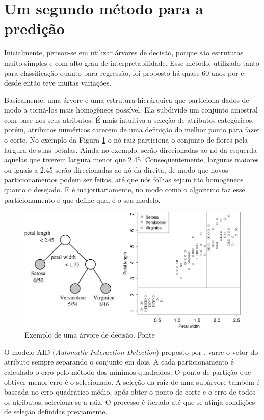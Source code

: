 \documentclass{article}
\begin{document}
\section{Um segundo método para a predição} \label{sec:firstpage}

Inicialmente, pensou-se em utilizar árvores de decisão, porque são estruturas muito simples e com alto grau de interpretabilidade. Esse método, utilizado tanto para classificação quanto para regressão, foi proposto há quase 60 anos por \cite{Morgan_1963} e desde então teve muitas variações.

Basicamente, uma árvore é uma estrutura hierárquica que particiona dados de modo a torná-los mais homogêneos possível. Ela subdivide um conjunto amostral com base nos seus atributos. É mais intuitiva a seleção de atributos categóricos, porém, atributos numéricos carecem de uma definição do melhor ponto para fazer o corte. No exemplo da Figura \ref{Fig1} o nó raiz particiona o conjunto de flores pela largura de suas pétalas. Ainda no exemplo, serão direcionadas ao nó da esquerda aquelas que tiverem largura menor que 2.45. Consequentemente, larguras maiores ou iguais a 2.45 serão direcionadas ao nó da direita, de modo que novos particionamentos podem ser feitos, até que nós folhas sejam tão homogêneos quanto o desejado. E é majoritariamente, no modo como o algoritmo faz esse particionamento é que define qual é o seu modelo.

\begin{figure}[ht]
\centering
\includegraphics[width=.5\textwidth]{fig1.png}
\caption{Exemplo de uma árvore de decisão. Fonte \cite{Loh_2014}}
\label{Fig1}
\end{figure}

O modelo AID (\emph{Automatic Interaction Detection}) proposto por \cite{Morgan_1963}, varre o vetor do atributo sempre separando o conjunto em dois. A cada particionamento é calculado o erro pelo método dos mínimos quadrados. O ponto de partição que obtiver menor erro é o selecionado. A seleção da raiz de uma subárvore também é baseada no erro quadrático médio, após obter o ponto de corte e o erro de todos os atributos, seleciona-se a raiz. O processo é iterado até que se atinja condições de seleção definidas previamente.
\end{document}
